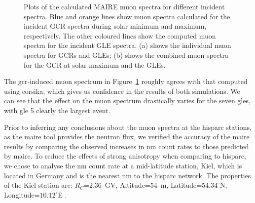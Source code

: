 \begin{figure}[ht!]
	\centering
	\qquad
	\caption{Plots of the calculated MAIRE muon spectra for different incident spectra. Blue and orange lines show muon spectra calculated for the incident GCR spectra during solar minimum and maximum, respectively. The other coloured lines show the computed muon spectra for the incident GLE spectra. (a) shows the individual muon spectra for GCRs and GLEs; (b) shows the combined muon spectra for the GCR at solar maximum and the GLEs.}
	\label{fig:MAIRE_muon_spectra}
\end{figure}


The \gls{gcr}-induced muon spectrum in Figure~\ref{fig:MAIRE_muon_spectra} roughly agrees with that computed using \gls{corsika}, which gives us confidence in the results of both simulations. We can see that the effect on the muon spectrum drastically varies for the seven \glspl{gle}, with \gls{gle} 5 clearly the largest event.

Prior to inferring any conclusions about the muon spectra at the \gls{hisparc} stations, as the \gls{maire} tool provides the neutron flux, we verified the accuracy of the \gls{maire} results by comparing the observed increases in \gls{nm} count rates to those predicted by \gls{maire}. To reduce the effects of strong anisotropy when comparing to \gls{hisparc}, we chose to analyse the \gls{nm} count rate at a mid-latitude station, Kiel, which is located in Germany and is the nearest \gls{nm} to the \gls{hisparc} network. The properties of the Kiel station are: $R_C$=2.36~GV, Altitude=54~m, Latitude=$54.34^{\circ}$N, Longitude=$10.12^{\circ}$E \citep{nmdb_nmdb_nodate}.

